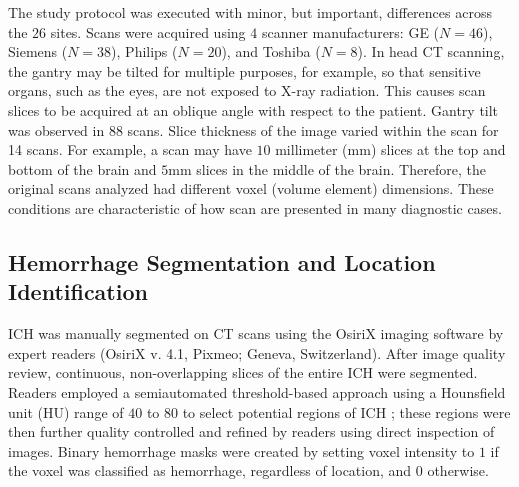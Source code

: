 \documentclass{elsarticle_nonatbib}\usepackage[]{graphicx}\usepackage[]{color}
\begin{document}
The study protocol was executed with minor, but important, differences across the $26$ sites.  Scans were acquired using $4$ scanner manufacturers: GE ($N=46$),  Siemens ($N=38$),  Philips ($N=20$),  and Toshiba ($N=8$).   In head CT scanning, the gantry may be tilted for multiple purposes, for example, so that sensitive organs, such as the eyes, are not exposed to X-ray radiation.  This causes scan slices to be acquired at an oblique angle with respect to the patient.  Gantry tilt was observed in $88$ scans.
Slice thickness of the image varied within the scan for 14 scans.
For example, a scan may have $10$ millimeter (mm) slices at the top and bottom of the brain and $5$mm slices in the middle of the brain.  Therefore, the original scans analyzed had different voxel (volume element) dimensions.  These conditions are characteristic of how scan are presented in many diagnostic cases.



\subsection{Hemorrhage Segmentation and Location Identification}
ICH was manually segmented on CT scans using the OsiriX imaging software by expert readers (OsiriX v. 4.1, Pixmeo; Geneva, Switzerland).  After image quality review, continuous, non-overlapping slices of the entire ICH were segmented.  Readers employed a semiautomated threshold-based approach using a Hounsfield unit (HU) range of $40$ to $80$ to select potential regions of ICH \citep{bergstrom_variation_1977, smith_imaging_2006}; these regions were then further quality controlled and refined by readers using direct inspection of images.  Binary hemorrhage masks were created by setting voxel intensity to $1$ if the voxel was classified as hemorrhage, regardless of location, and $0$ otherwise.
\end{document}
